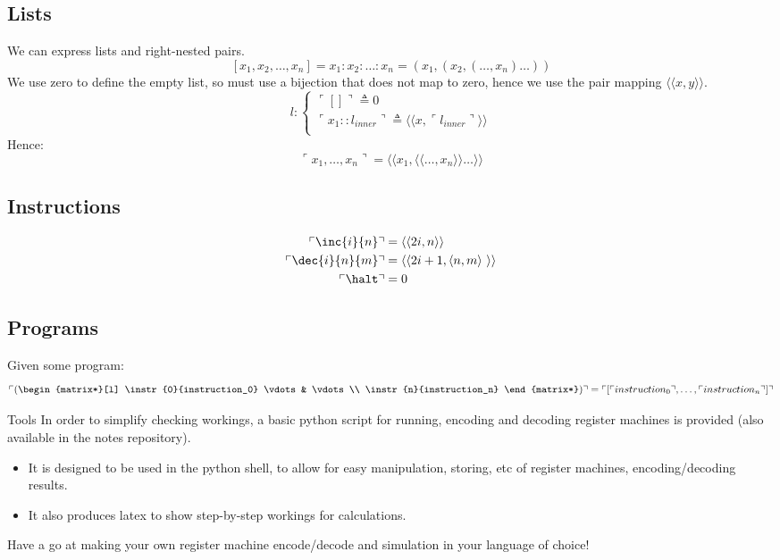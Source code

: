 \subsection{Lists}
We can express lists and right-nested pairs.
\[[x_1, x_2, \dots, x_n] = x_1:x_2:\dots:x_n = (x_1, (x_2, (\dots, x_n) \dots ))\]
We use zero to define the empty list, so must use a bijection that does not map to zero, hence we use the pair mapping $\langle\langle x,y \rangle\rangle$.
\[l : \begin{cases}
		\ulcorner [] \urcorner \triangleq 0                                                                            \\
		\ulcorner x_1 :: l_{inner} \urcorner \triangleq \langle\langle x, \ulcorner l_{inner} \urcorner \rangle\rangle \\
	\end{cases}\]
Hence:
\[\ulcorner x_1, \dots, x_n \urcorner = \langle\langle x_1 , \langle\langle \dots, x_n\rangle\rangle \dots \rangle\rangle\]
\subsection{Instructions}
\[\begin{split}
		\ulcorner \inc{i}{n} \urcorner &= \langle\langle 2i, n \rangle\rangle \\
		\ulcorner \dec{i}{n}{m} \urcorner &= \langle\langle 2i + 1, \langle n,m \rangle \  \rangle\rangle \\
		\ulcorner \halt \urcorner &= 0 \\
	\end{split}\]
\subsection{Programs}
Given some program:
\[\ulcorner \left( \begin{matrix*}[l]
			\instr{0}{instruction_0}
			\vdots & \vdots \\
			\instr{n}{instruction_n}
		\end{matrix*} \right) \urcorner = \ulcorner [\ulcorner instruction_0 \urcorner, \dots, \ulcorner instruction_n \urcorner] \urcorner\]

\begin{sidenotebox}{Tools}
	In order to simplify checking workings, a basic python script for running, encoding and decoding register machines is provided (also available in the notes repository).
	\begin{itemize}
		\item It is designed to be used in the python shell, to allow for easy manipulation, storing, etc of register machines, encoding/decoding results.
		\item It also produces latex to show step-by-step workings for calculations.
	\end{itemize}
	Have a go at making your own register machine encode/decode and simulation in your language of choice!
\end{sidenotebox}
